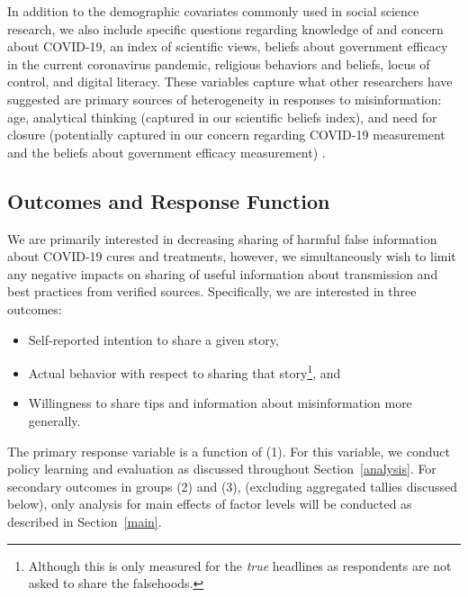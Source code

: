 \documentclass[letterpaper, 12pt, parskip=full,DIV=10]{scrartcl}
\begin{document}
In addition to the demographic covariates commonly used in social science research, we also include specific questions regarding knowledge of and concern about COVID-19, an index of scientific views, beliefs about government efficacy in the current coronavirus pandemic, religious behaviors and beliefs, locus of control, and digital literacy. These variables capture what other researchers have suggested are primary sources of heterogeneity in responses to misinformation: age, analytical thinking (captured in our scientific beliefs index), and need for closure (potentially captured in our concern regarding COVID-19 measurement and the beliefs about government efficacy measurement) \citep{wittenberg2020misinformation}. 



\subsection{Outcomes and Response Function}\label{response}

We are primarily interested in decreasing sharing of harmful false information about COVID-19 cures and treatments, however, we simultaneously wish to limit any negative impacts on sharing of useful information about transmission and best practices from verified sources. Specifically, we are interested in three outcomes: 
\begin{itemize}
\item[(1)] Self-reported intention to share a given story, 
\item[(2)] Actual behavior with respect to sharing that story\footnote{Although this is only measured for the \textit{true} headlines as respondents are not asked to share the falsehoods.}, and
\item[(3)] Willingness to share tips and information about misinformation more generally.
\end{itemize}
The primary response variable is a function of (1). For this variable, we conduct policy learning and evaluation as discussed throughout Section~\ref{analysis}. For secondary outcomes in groups (2) and (3), (excluding aggregated tallies discussed below), only analysis for main effects of factor levels will be conducted as described in Section~\ref{main}.  
\end{document}

